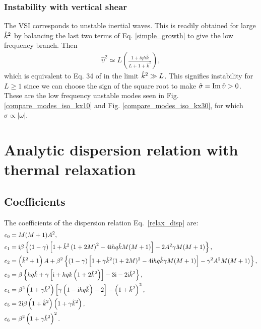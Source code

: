 \subsubsection{Instability with vertical shear}
The VSI corresponds to unstable inertial waves. This
is readily obtained for large $\hat{k}^2$ by balancing
the last two terms of Eq. \ref{simple_growth} to give the low
frequency branch. Then 
\begin{align}
  \hat{\upsilon}^2 \simeq L\left(\frac{1+\ii q h
       \hat{k}}{L+1+\hat{k}^2}\right), \label{simple_growth2}
\end{align}
which is equivalent to Eq. 34 of  in the limit
$\hat{k}^2\gg L$. This signifies instability for
$L\geq1$ since we can choose the sign 
of the square root to make $\hat{\sigma} = \operatorname{Im}\hat{\upsilon}>0$.  These
are the low frequency unstable modes seen in
Fig. \ref{compare_modes_iso_kx10} and
Fig. \ref{compare_modes_iso_kx30}, for which $\sigma\propto|\omega|$.  

\section{Analytic dispersion relation
with thermal relaxation}
\subsection{Coefficients}\label{relax_coeff}
The coefficients of the dispersion relation Eq.\ \ref{relax_disp} are:
\begin{subequations}\label{coeffs}\begin{align}
  &c_0 = M(M+1)A^2,\\
  &c_1 = \mathrm{i}\beta\left\{\left(1-\gamma\right)\left[1 +
      \hat{k}^2\left(1+2M\right)^2 - 4 \mathrm{i} h q\hat{k} M (M+1)\right] 
    - 2A^2\gamma M (M+1)\right\},\\
  &c_2 = \left(\hat{k}^2 + 1\right)A + \beta^2\left\{(1-\gamma)\left[1
      + \gamma \hat{k}^2(1+2M)^2 - 4\mathrm{i} h q \hat{k} \gamma M(M+1)
    \right]
    -\gamma^2 A^2 M(M+1)
  \right\},\\
  &c_3 = \beta\left\{h q \hat{k} + \gamma \left[\mathrm{i} + h q
      k \left(1+2\hat{k}^2\right)\right] - 3\mathrm{i} - 2\mathrm{i}
    \hat{k}^2\right\},\\
  &c_4 =
  \beta^2\left(1+\gamma\hat{k}^2\right)\left[\gamma\left(1-\mathrm{i} h q
    \hat{k}\right)-2\right] - \left(1+\hat{k}^2\right)^2,\\
&c_5 = 2\mathrm{i}\beta\left(1+\hat{k}^2\right)\left(1+\gamma\hat{k}^2\right),\\
&c_6 = \beta^2\left(1+\gamma\hat{k}^2\right)^2.
\end{align}\end{subequations}

